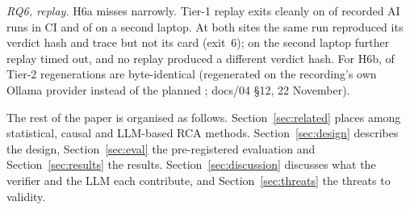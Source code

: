 \emph{RQ6, replay.}
H6a misses narrowly.
Tier-1 replay exits cleanly on  of  recorded AI runs in CI and  of  on a second laptop.
At both sites the same run reproduced its verdict hash and trace but not its card (exit~6); on the second laptop  further replay timed out, and no replay produced a different verdict hash.
For H6b,  of  Tier-2 regenerations are byte-identical (regenerated on the recording's own Ollama provider instead of the planned ; docs/04 §12, 22 November).

The rest of the paper is organised as follows.
Section~\ref{sec:related} places \sys among statistical, causal and LLM-based RCA methods.
Section~\ref{sec:design} describes the design, Section~\ref{sec:eval} the pre-registered evaluation and Section~\ref{sec:results} the results.
Section~\ref{sec:discussion} discusses what the verifier and the LLM each contribute, and Section~\ref{sec:threats} the threats to validity.
